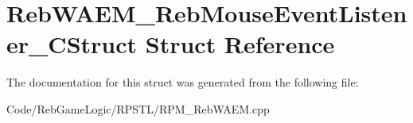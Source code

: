 \hypertarget{struct_reb_w_a_e_m___reb_mouse_event_listener___c_struct}{}\section{Reb\+W\+A\+E\+M\+\_\+\+Reb\+Mouse\+Event\+Listener\+\_\+\+C\+Struct Struct Reference}
\label{struct_reb_w_a_e_m___reb_mouse_event_listener___c_struct}


The documentation for this struct was generated from the following file\+:\begin{DoxyCompactItemize}
\item 
Code/\+Reb\+Game\+Logic/\+R\+P\+S\+T\+L/R\+P\+M\+\_\+\+Reb\+W\+A\+E\+M.\+cpp\end{DoxyCompactItemize}
